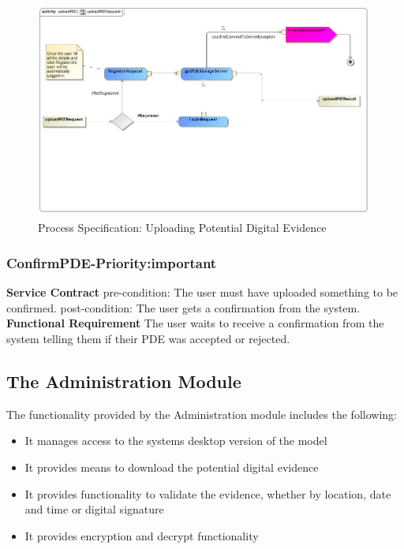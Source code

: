 \documentclass[a4paper,12pt]{article}
\begin{document}
\begin{figure}[H]
\includegraphics[width=\textwidth]{images/uploadPDERequest.jpg}
\caption{Process Specification: Uploading Potential Digital Evidence \label{overflow}}
\end{figure}
\subsubsection{ConfirmPDE-Priority:important}
\textbf{Service Contract}\newline
pre-condition: The user must have uploaded something to be confirmed.\newline
post-condition: The user gets a confirmation from the system.\newline
\textbf{Functional Requirement}\newline
The user waits to receive a confirmation from the system telling them if their PDE was accepted or rejected.\newpage
\subsection{The Administration Module}
The functionality provided by the Administration module includes the following:
\begin{itemize}
\item It manages access to the systems desktop version of the model
\item It provides means to download the potential digital evidence
\item It provides functionality to validate the evidence, whether by location, date and time or digital signature
\item It provides encryption and decrypt functionality
\end{itemize}
\end{document}
